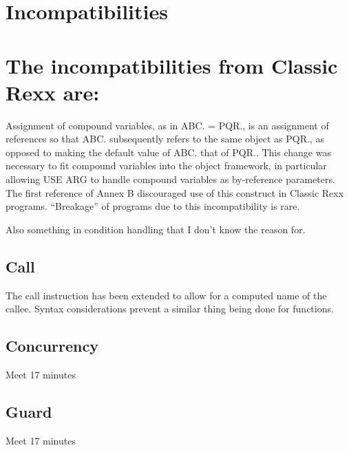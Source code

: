 \chapter{Incompatibilities}\label{incompatibilities}

\chapter{The incompatibilities from Classic Rexx
are:}\label{the-incompatibilities-from-classic-rexx-are}

Assignment of compound variables, as in ABC. = PQR., is an assignment of
references so that ABC. subsequently refers to the same object as PQR.,
as opposed to making the default value of ABC. that of PQR.. This change
was necessary to fit compound variables into the object framework, in
particular allowing USE ARG to handle compound variables as by-reference
parameters. The first reference of Annex B discouraged use of this
construct in Classic Rexx programs. ``Breakage'' of programs due to this
incompatibility is rare.

Also something in condition handling that I don't know the reason for.

\section{Call}\label{call}

The call instruction has been extended to allow for a computed name of
the callee. Syntax considerations prevent a similar thing being done for
functions.

\section{Concurrency}\label{concurrency}

Meet 17 minutes

\section{Guard}\label{guard}

Meet 17 minutes
